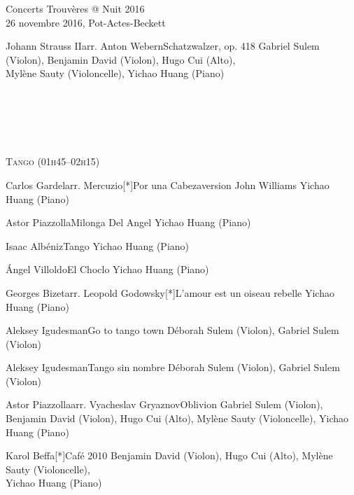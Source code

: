 \documentclass[a4paper,11pt,poets,durations]{ConcProg}
\begin{document}
{\begin{programme}{
    Concerts Trouvères @ Nuit 2016
\\  {\normalsize 26 novembre 2016, Pot-Actes-Beckett}
}
\begin{part}[]
\begin{composition}{Johann Strauss II}{arr. Anton Webern}{Schatzwalzer, op. 418}{}
      {\small Gabriel Sulem (Violon), Benjamin David (Violon), Hugo Cui (Alto),\\Mylène Sauty (Violoncelle), Yichao Huang (Piano)}
    \end{composition}\\
~\\
~\\
~\\
\begin{center}
\textsc{Tango (01h45--02h15)}
\end{center}
    \begin{composition}{Carlos Gardel}{arr. Mercuzio}{[*]Por una Cabeza}{version John Williams}
      {\small Yichao Huang (Piano)}
    \end{composition}
    \begin{composition}{Astor Piazzolla}{}{Milonga Del Angel}{}
      {\small Yichao Huang (Piano)}
    \end{composition}
    \begin{composition}{Isaac Albéniz}{}{Tango}{}
      {\small Yichao Huang (Piano)}
    \end{composition}
    \begin{composition}{Ángel Villoldo}{}{El Choclo}{}
      {\small Yichao Huang (Piano)}
    \end{composition}
    \begin{composition}{Georges Bizet}{arr. Leopold Godowsky}{[*]L'amour est un oiseau rebelle}{}
      {\small Yichao Huang (Piano)}
    \end{composition}
    \begin{composition}{Aleksey Igudesman}{}{Go to tango town}{}
      {\small Déborah Sulem (Violon), Gabriel Sulem (Violon)}
    \end{composition}
    \begin{composition}{Aleksey Igudesman}{}{Tango sin nombre}{}
      {\small Déborah Sulem (Violon), Gabriel Sulem (Violon)}
    \end{composition}
    \begin{composition}{Astor Piazzolla}{arr. Vyacheslav Gryaznov}{Oblivion}{}
      {\small Gabriel Sulem (Violon), Benjamin David (Violon), Hugo Cui (Alto), Mylène Sauty (Violoncelle), Yichao Huang (Piano)}
    \end{composition}
    \begin{composition}{Karol Beffa}{}{[*]Café 2010}{}
      {\small Benjamin David (Violon), Hugo Cui (Alto), Mylène Sauty (Violoncelle),\\Yichao Huang (Piano)}

\end{composition}
\end{part}
\end{programme}}
\end{document}
